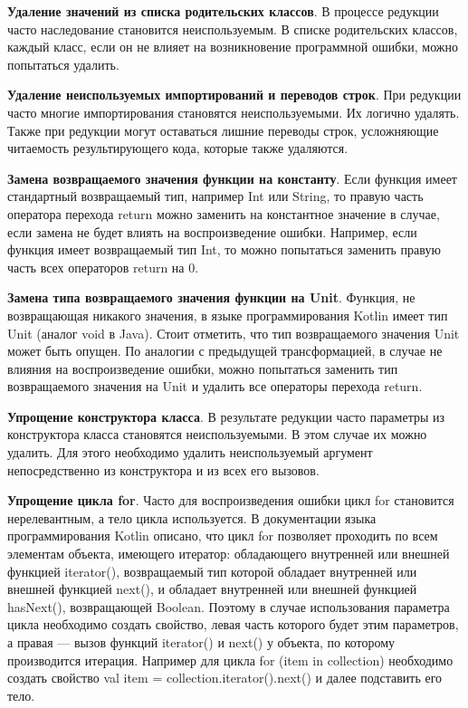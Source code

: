 \textbf{Удаление значений из списка родительских классов}. В процессе редукции часто наследование становится неиспользуемым. В списке родительских классов, каждый класс, если он не влияет на возникновение программной ошибки, можно попытаться удалить.

\textbf{Удаление неиспользуемых импортирований и переводов строк}. При редукции часто многие импортирования становятся неиспользуемыми. Их логично удалять. Также при редукции могут оставаться лишние переводы строк, усложняющие читаемость результирующего кода, которые также удаляются.

\textbf{Замена возвращаемого значения функции на константу}. Если функция имеет стандартный возвращаемый тип, например Int или String, то правую часть оператора перехода return можно заменить на константное значение в случае, если замена не будет влиять на воспроизведение ошибки. Например, если функция имеет возвращаемый тип Int, то можно попытаться заменить правую часть всех операторов return на 0.

\textbf{Замена типа возвращаемого значения функции на Unit}. Функция, не возвращающая никакого значения, в языке программирования Kotlin имеет тип Unit (аналог void в Java). Стоит отметить, что тип возвращаемого значения Unit может быть опущен. По аналогии с предыдущей трансформацией, в случае не влияния на воспроизведение ошибки, можно попытаться заменить тип возвращаемого значения на Unit и удалить все операторы перехода return.

\textbf{Упрощение конструктора класса}. В результате редукции часто параметры из конструктора класса становятся неиспользуемыми. В этом случае их можно удалить. Для этого необходимо удалить неиспользуемый аргумент непосредственно из конструктора и из всех его вызовов.

\textbf{Упрощение цикла for}. Часто для воспроизведения ошибки цикл for становится нерелевантным, а тело цикла используется. В документации языка программирования Kotlin описано, что цикл for позволяет проходить по всем элементам объекта, имеющего итератор:
обладающего внутренней или внешней функцией iterator(), возвращаемый тип которой обладает внутренней или внешней функцией next(), и обладает внутренней или внешней функцией hasNext(), возвращающей Boolean. Поэтому в случае использования параметра цикла необходимо создать свойство, левая часть которого будет этим параметров, а правая --- вызов функций iterator() и next() у объекта, по которому производится итерация. Например для цикла {\ttfamily for (item in collection)} необходимо создать свойство {\ttfamily val item = collection.iterator().next()} и далее подставить его тело.

